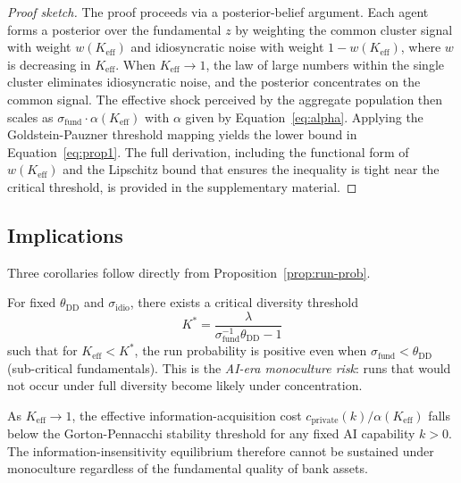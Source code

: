 \begin{proof}[Proof sketch]
The proof proceeds via a posterior-belief argument. Each agent forms a posterior over the fundamental $z$ by weighting the common cluster signal with weight $w(K_{\text{eff}})$ and idiosyncratic noise with weight $1 - w(K_{\text{eff}})$, where $w$ is decreasing in $K_{\text{eff}}$. When $K_{\text{eff}} \to 1$, the law of large numbers within the single cluster eliminates idiosyncratic noise, and the posterior concentrates on the common signal. The effective shock perceived by the aggregate population then scales as $\sigma_{\text{fund}} \cdot \alpha(K_{\text{eff}})$ with $\alpha$ given by Equation~\eqref{eq:alpha}. Applying the Goldstein-Pauzner threshold mapping \citep{goldstein2005demand} yields the lower bound in Equation~\eqref{eq:prop1}. The full derivation, including the functional form of $w(K_{\text{eff}})$ and the Lipschitz bound that ensures the inequality is tight near the critical threshold, is provided in the supplementary material.
\end{proof}

\subsection{Implications}

Three corollaries follow directly from Proposition~\ref{prop:run-prob}.

\begin{corollary}
\label{cor:subcritical}
For fixed $\theta_{\text{DD}}$ and $\sigma_{\text{idio}}$, there exists a critical diversity threshold
\[
  K^* = \frac{\lambda}{\sigma_{\text{fund}}^{-1}\theta_{\text{DD}} - 1}
\]
such that for $K_{\text{eff}} < K^*$, the run probability is positive even when $\sigma_{\text{fund}} < \theta_{\text{DD}}$ (sub-critical fundamentals). This is the \emph{AI-era monoculture risk}: runs that would not occur under full diversity become likely under concentration.
\end{corollary}

\begin{corollary}
\label{cor:gp-collapse}
As $K_{\text{eff}} \to 1$, the effective information-acquisition cost $c_{\text{private}}(k) / \alpha(K_{\text{eff}})$ falls below the Gorton-Pennacchi stability threshold for any fixed AI capability $k > 0$. The information-insensitivity equilibrium therefore cannot be sustained under monoculture regardless of the fundamental quality of bank assets.
\end{corollary}

